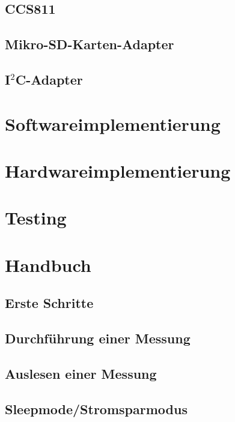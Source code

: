 \documentclass[12pt,			%
a4paper,						%
twoside, 						%
listof=totoc, 					%
bibliography=totoc,				%
titlepage, 						%
headsepline, 					%
DIV18,							%
BCOR6mm,						%
cleardoublepage=empty,			%
parskip,						%
ngerman							%
]{scrbook}
\begin{document}
\section{CCS811}

\section{Mikro-SD-Karten-Adapter}

\section{I$^2$C-Adapter}


\chapter{Softwareimplementierung}


\chapter{Hardwareimplementierung}


\chapter{Testing}


\chapter{Handbuch}

\section{Erste Schritte}

\section{Durchführung einer Messung}

\section{Auslesen einer Messung}

\section{Sleepmode/Stromsparmodus}

\end{document}
